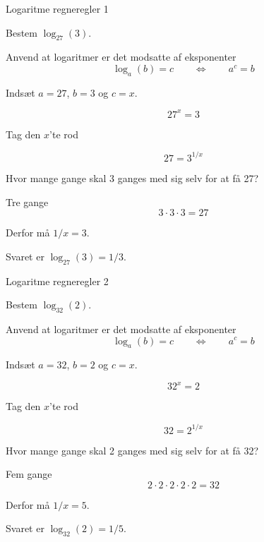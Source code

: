 \documentclass{article}
\begin{document}
\tableofcontents
\newpage

\begin{exercise}{Logaritme regneregler 1}

Bestem $\log_{27}(3)$.


\hint

Anvend at logaritmer er det modsatte af eksponenter
\[
\log_a(b) = c \qquad \Leftrightarrow \qquad a^c = b
\]

\hint

Indsæt $a=27$, $b=3$ og $c=x$.

\hint
\[
27^x = 3
\]

\hint
Tag den $x$'te rod

\hint
\[
27 = 3^{1/x}
\]

\hint
Hvor mange gange skal 3 ganges med sig selv for at få 27?

\hint
Tre gange
\[
3 \cdot 3 \cdot 3 = 27
\]

\hint
Derfor må $1/x = 3$.

\hint
Svaret er $\log_{27}(3) = 1/3$.

\end{exercise}

\newpage

\begin{exercise}{Logaritme regneregler 2}

Bestem $\log_{32}(2)$.


\hint

Anvend at logaritmer er det modsatte af eksponenter
\[
\log_a(b) = c \qquad \Leftrightarrow \qquad a^c = b
\]

\hint

Indsæt $a=32$, $b=2$ og $c=x$.

\hint
\[
32^x = 2
\]

\hint
Tag den $x$'te rod

\hint
\[
32 = 2^{1/x}
\]

\hint
Hvor mange gange skal 2 ganges med sig selv for at få 32?

\hint
Fem gange
\[
2 \cdot 2 \cdot 2 \cdot 2 \cdot 2 = 32
\]

\hint
Derfor må $1/x = 5$.

\hint
Svaret er $\log_{32}(2) = 1/5$.

\end{exercise}
\end{document}
